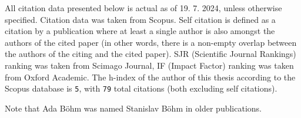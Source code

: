 All citation data presented below is actual as of 19. 7. 2024, unless otherwise
            specified. Citation data was taken from Scopus.
Self citation is defined as a citation by a publication where at least a single author is also amongst
the authors of the cited paper (in other words, there is a non-empty overlap between the authors of the citing and the cited paper).
SJR (Scientific Journal Rankings) ranking was taken from Scimago Journal,
IF (Impact Factor) ranking was taken from Oxford Academic.
The h-index of the author of this thesis according to the Scopus database is \texttt{5},
with \texttt{79} total citations (both excluding self citations).

Note that Ada Böhm was named Stanislav Böhm in older publications.

